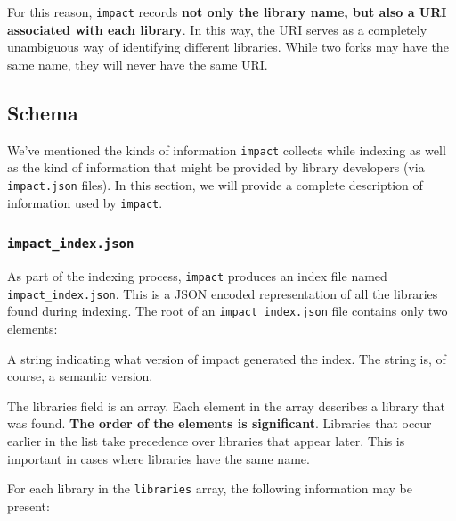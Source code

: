 \documentclass[11pt,a4paper,twocolumn]{article}
\newcommand{\code}[1]{\texttt{#1}} %
\begin{document}
For this reason, \code{impact} records \textbf{not only the library name,
  but also a URI associated with each library}.  In this way, the URI
serves as a completely unambiguous way of identifying different
libraries.  While two forks may have the same name, they will never
have the same URI\@.

\subsection{Schema}

We've mentioned the kinds of information \code{impact} collects while
indexing as well as the kind of information that might be provided by
library developers (via \code{impact.json} files).  In this section,
we will provide a complete description of information used by
\code{impact}.

\subsubsection{\code{impact\_index.json}}
\label{sec:index_schema}

As part of the indexing process, \code{impact} produces an index file
named \code{impact\_index.json}.  This is a JSON encoded
representation of all the libraries found during indexing.  The root
of an \code{impact\_index.json} file contains only two elements:

\begin{description}[noitemsep]
  \item[\code{version}] A string indicating what version of impact
    generated the index.  The string is, of course, a semantic
    version.
  \item[\code{libraries}] The libraries field is an array.  Each
    element in the array describes a library that was found.  \textbf{The
      order of the elements is significant}.  Libraries that occur
    earlier in the list take precedence over libraries that appear
    later.  This is important in cases where libraries have the same
    name.
\end{description}

For each library in the \code{libraries} array, the following
information may be present:
\end{document}

